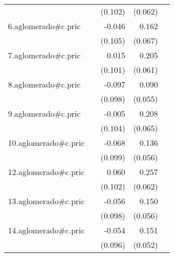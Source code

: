 {\begin{longtable}{l*{4}{D{.}{.}{-1}}}
            &                     &     (0.102)         &     (0.062)         &                     \\
\addlinespace
6.aglomerado#c.pric&                     &      -0.046         &       0.162\sym{*}  &                     \\
            &                     &     (0.105)         &     (0.067)         &                     \\
\addlinespace
7.aglomerado#c.pric&                     &       0.015         &       0.205\sym{***}&                     \\
            &                     &     (0.101)         &     (0.061)         &                     \\
\addlinespace
8.aglomerado#c.pric&                     &      -0.097         &       0.090         &                     \\
            &                     &     (0.098)         &     (0.055)         &                     \\
\addlinespace
9.aglomerado#c.pric&                     &      -0.005         &       0.208\sym{**} &                     \\
            &                     &     (0.104)         &     (0.065)         &                     \\
\addlinespace
10.aglomerado#c.pric&                     &      -0.068         &       0.136\sym{*}  &                     \\
            &                     &     (0.099)         &     (0.056)         &                     \\
\addlinespace
12.aglomerado#c.pric&                     &       0.060         &       0.257\sym{***}&                     \\
            &                     &     (0.102)         &     (0.062)         &                     \\
\addlinespace
13.aglomerado#c.pric&                     &      -0.056         &       0.150\sym{**} &                     \\
            &                     &     (0.098)         &     (0.056)         &                     \\
\addlinespace
14.aglomerado#c.pric&                     &      -0.054         &       0.151\sym{**} &                     \\
            &                     &     (0.096)         &     (0.052)         &                     \\

\end{longtable}}
